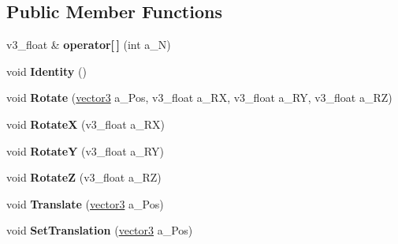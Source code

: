 \subsection*{Public Member Functions}
\begin{DoxyCompactItemize}
\item 
v3\+\_\+float \& {\bfseries operator\mbox{[}$\,$\mbox{]}} (int a\+\_\+N)\hypertarget{classns__phys_1_1matrix_aaca39d1ebaa7883da97e525fda2205b5}{}\label{classns__phys_1_1matrix_aaca39d1ebaa7883da97e525fda2205b5}

\item 
void {\bfseries Identity} ()\hypertarget{classns__phys_1_1matrix_afa2bbbf3e969a31c625adecf5acd3075}{}\label{classns__phys_1_1matrix_afa2bbbf3e969a31c625adecf5acd3075}

\item 
void {\bfseries Rotate} (\hyperlink{classns__phys_1_1vector3}{vector3} a\+\_\+\+Pos, v3\+\_\+float a\+\_\+\+RX, v3\+\_\+float a\+\_\+\+RY, v3\+\_\+float a\+\_\+\+RZ)\hypertarget{classns__phys_1_1matrix_a4e50de481e22df9829119371549e776c}{}\label{classns__phys_1_1matrix_a4e50de481e22df9829119371549e776c}

\item 
void {\bfseries RotateX} (v3\+\_\+float a\+\_\+\+RX)\hypertarget{classns__phys_1_1matrix_ad4e41375d9d880adbe6b05f1f8202c70}{}\label{classns__phys_1_1matrix_ad4e41375d9d880adbe6b05f1f8202c70}

\item 
void {\bfseries RotateY} (v3\+\_\+float a\+\_\+\+RY)\hypertarget{classns__phys_1_1matrix_a01bb8550e1a292996ac4cf6a1cfbd034}{}\label{classns__phys_1_1matrix_a01bb8550e1a292996ac4cf6a1cfbd034}

\item 
void {\bfseries RotateZ} (v3\+\_\+float a\+\_\+\+RZ)\hypertarget{classns__phys_1_1matrix_a770167fe88dcc9408cda918db61ce5ca}{}\label{classns__phys_1_1matrix_a770167fe88dcc9408cda918db61ce5ca}

\item 
void {\bfseries Translate} (\hyperlink{classns__phys_1_1vector3}{vector3} a\+\_\+\+Pos)\hypertarget{classns__phys_1_1matrix_a13ef42c6b623bd8c50e2f20a3e9a33ce}{}\label{classns__phys_1_1matrix_a13ef42c6b623bd8c50e2f20a3e9a33ce}

\item 
void {\bfseries Set\+Translation} (\hyperlink{classns__phys_1_1vector3}{vector3} a\+\_\+\+Pos)\hypertarget{classns__phys_1_1matrix_a39b22741e83243f7f950f726f1c98005}{}\label{classns__phys_1_1matrix_a39b22741e83243f7f950f726f1c98005}


\end{DoxyCompactItemize}
